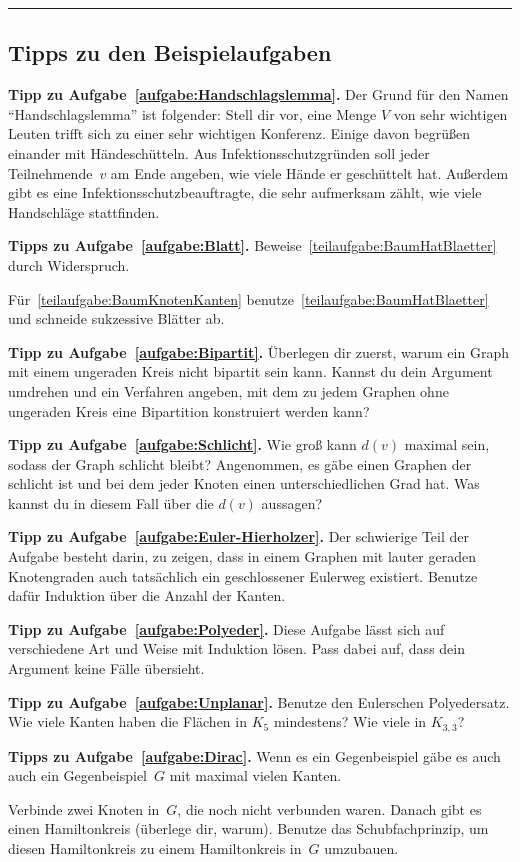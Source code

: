 \vfill\hrule\vspace{-1em}

\subsection*{Tipps zu den Beispielaufgaben}
\textbf{Tipp zu Aufgabe~\ref{aufgabe:Handschlagslemma}.} Der Grund für den Namen \enquote{Handschlagslemma} ist folgender: Stell dir vor, eine Menge $V$ von sehr wichtigen Leuten trifft sich zu einer sehr wichtigen Konferenz. Einige davon begrüßen einander mit Händeschütteln. Aus Infektionsschutzgründen soll jeder Teilnehmende~$v$ am Ende angeben, wie viele Hände er geschüttelt hat. Außerdem gibt es eine Infektionsschutzbeauftragte, die sehr aufmerksam zählt, wie viele Handschläge stattfinden.

\textbf{Tipps zu Aufgabe~\ref{aufgabe:Blatt}.} Beweise~\ref{teilaufgabe:BaumHatBlaetter} durch Widerspruch.

Für~\ref{teilaufgabe:BaumKnotenKanten} benutze~\ref{teilaufgabe:BaumHatBlaetter} und schneide sukzessive Blätter ab.
	
\textbf{Tipp zu Aufgabe~\ref{aufgabe:Bipartit}.} Überlegen dir zuerst, warum ein Graph mit einem ungeraden Kreis nicht bipartit sein kann. Kannst du dein Argument umdrehen und ein Verfahren angeben, mit dem zu jedem Graphen ohne ungeraden Kreis eine Bipartition konstruiert werden kann?

\textbf{Tipp zu Aufgabe~\ref{aufgabe:Schlicht}.}
Wie groß kann $d(v)$ maximal sein, sodass der Graph schlicht bleibt? Angenommen, es gäbe einen Graphen der schlicht ist und bei dem jeder Knoten einen unterschiedlichen Grad hat. Was kannst du in diesem Fall über die $d(v)$ aussagen?

\textbf{Tipp zu Aufgabe~\ref{aufgabe:Euler-Hierholzer}.}
Der schwierige Teil der Aufgabe besteht darin, zu zeigen, dass in einem Graphen mit lauter geraden Knotengraden auch tatsächlich ein geschlossener Eulerweg existiert.  Benutze dafür Induktion über die Anzahl der Kanten.

\textbf{Tipp zu Aufgabe~\ref{aufgabe:Polyeder}.} Diese Aufgabe lässt sich auf verschiedene Art und Weise mit Induktion lösen. Pass dabei auf, dass dein Argument keine Fälle übersieht.

\textbf{Tipp zu Aufgabe~\ref{aufgabe:Unplanar}.} Benutze den Eulerschen Polyedersatz. Wie viele Kanten haben die Flächen in $K_5$ mindestens? Wie viele in $K_{3,3}$?

\textbf{Tipps zu Aufgabe~\ref{aufgabe:Dirac}.} Wenn es ein Gegenbeispiel gäbe es auch auch ein Gegenbeispiel~$G$ mit maximal vielen Kanten.

Verbinde zwei Knoten in~$G$, die noch nicht verbunden waren. Danach gibt es einen Hamiltonkreis (überlege dir, warum). Benutze das Schubfachprinzip, um diesen Hamiltonkreis zu einem Hamiltonkreis in~$G$ umzubauen.



